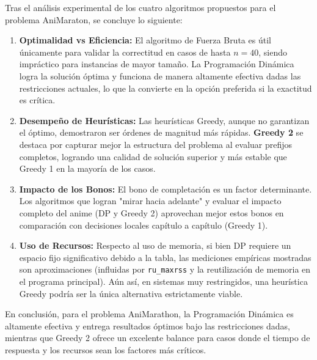 Tras el análisis experimental de los cuatro algoritmos propuestos para el problema AniMaraton, se concluye lo siguiente:

\begin{enumerate}
    \item \textbf{Optimalidad vs Eficiencia:} El algoritmo de Fuerza Bruta es útil únicamente para validar la correctitud en casos de hasta $n=40$, siendo impráctico para instancias de mayor tamaño. La Programación Dinámica logra la solución óptima y funciona de manera altamente efectiva dadas las restricciones actuales, lo que la convierte en la opción preferida si la exactitud es crítica.
    \item \textbf{Desempeño de Heurísticas:} Las heurísticas Greedy, aunque no garantizan el óptimo, demostraron ser órdenes de magnitud más rápidas. \textbf{Greedy 2} se destaca por capturar mejor la estructura del problema al evaluar prefijos completos, logrando una calidad de solución superior y más estable que Greedy 1 en la mayoría de los casos.
    \item \textbf{Impacto de los Bonos:} El bono de completación es un factor determinante. Los algoritmos que logran "mirar hacia adelante" y evaluar el impacto completo del anime (DP y Greedy 2) aprovechan mejor estos bonos en comparación con decisiones locales capítulo a capítulo (Greedy 1).
    \item \textbf{Uso de Recursos:} Respecto al uso de memoria, si bien DP requiere un espacio fijo significativo debido a la tabla, las mediciones empíricas mostradas son aproximaciones (influidas por \texttt{ru\_maxrss} y la reutilización de memoria en el programa principal). Aún así, en sistemas muy restringidos, una heurística Greedy podría ser la única alternativa estrictamente viable.
\end{enumerate}

En conclusión, para el problema AniMarathon, la Programación Dinámica es altamente efectiva y entrega resultados óptimos bajo las restricciones dadas, mientras que Greedy 2 ofrece un excelente balance para casos donde el tiempo de respuesta y los recursos sean los factores más críticos.
